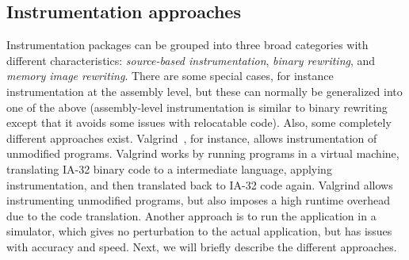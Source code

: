\subsection{Instrumentation approaches}
Instrumentation packages can be grouped into three broad categories with
different characteristics: \emph{source-based instrumentation}, \emph{binary
  rewriting}, and \emph{memory image rewriting}.  There are some special
cases, for instance instrumentation at the assembly level, but these can
normally be generalized into one of the above (assembly-level instrumentation
is similar to binary rewriting except that it avoids some issues with
relocatable code). Also, some completely different approaches exist.
Valgrind~\cite{valgrind}, for instance, allows instrumentation of unmodified
programs. Valgrind works by running programs in a virtual machine, translating
IA-32 binary code to a intermediate language, applying instrumentation, and
then translated back to IA-32 code again. Valgrind allows instrumenting
unmodified programs, but also imposes a high runtime overhead due to the code
translation. Another approach is to run the application in a simulator, which
gives no perturbation to the actual application, but has issues with accuracy
and speed. Next, we will briefly describe the different approaches.

